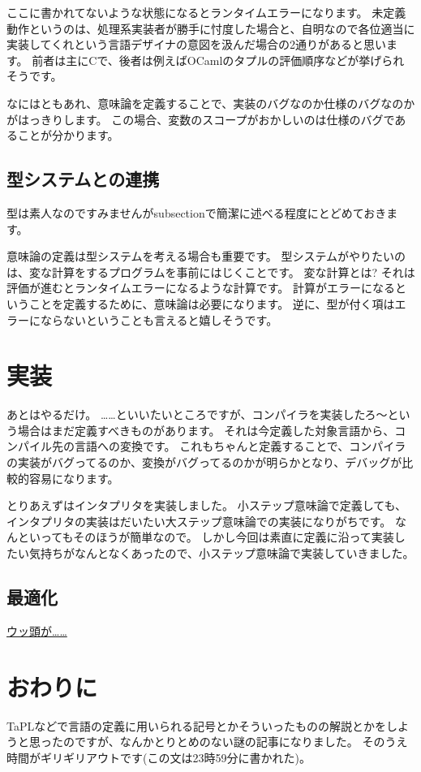 \documentclass{ltjsarticle}
\begin{document}
ここに書かれてないような状態になるとランタイムエラーになります。
未定義動作というのは、処理系実装者が勝手に忖度した場合と、自明なので各位適当に実装してくれという言語デザイナの意図を汲んだ場合の2通りがあると思います。
前者は主にCで、後者は例えばOCamlのタプルの評価順序などが挙げられそうです。

なにはともあれ、意味論を定義することで、実装のバグなのか仕様のバグなのかがはっきりします。
この場合、変数のスコープがおかしいのは仕様のバグであることが分かります。

\subsection{型システムとの連携}
型は素人なのですみませんがsubsectionで簡潔に述べる程度にとどめておきます。

意味論の定義は型システムを考える場合も重要です。
型システムがやりたいのは、変な計算をするプログラムを事前にはじくことです。
変な計算とは?
それは評価が進むとランタイムエラーになるような計算です。
計算がエラーになるということを定義するために、意味論は必要になります。
逆に、型が付く項はエラーにならないということも言えると嬉しそうです。

\section{実装}
あとはやるだけ。
……といいたいところですが、コンパイラを実装したろ〜という場合はまだ定義すべきものがあります。
それは今定義した対象言語から、コンパイル先の言語への変換です。
これもちゃんと定義することで、コンパイラの実装がバグってるのか、変換がバグってるのかが明らかとなり、デバッグが比較的容易になります。

とりあえず\lambdaeff{}はインタプリタを実装しました。
小ステップ意味論で定義しても、インタプリタの実装はだいたい大ステップ意味論での実装になりがちです。
なんといってもそのほうが簡単なので。
しかし今回は素直に定義に沿って実装したい気持ちがなんとなくあったので、小ステップ意味論で実装していきました。

\subsection{最適化}
\href{https://nymphium.github.io/2018/01/31/%E3%82%B3%E3%83%B3%E3%83%91%E3%82%A4%E3%83%A9%E4%B8%AD%E9%96%93%E8%A8%80%E8%AA%9E%E3%81%8A%E3%82%88%E3%81%B3%E3%81%9D%E3%81%AE%E6%9C%80%E9%81%A9%E5%8C%96%E3%81%AE%E5%AE%9F%E8%A3%85.html}{ウッ頭が……}

\section{おわりに}
TaPLなどで言語の定義に用いられる記号とかそういったものの解説とかをしようと思ったのですが、なんかとりとめのない謎の記事になりました。
そのうえ時間がギリギリアウトです(この文は23時59分に書かれた)。
\end{document}
